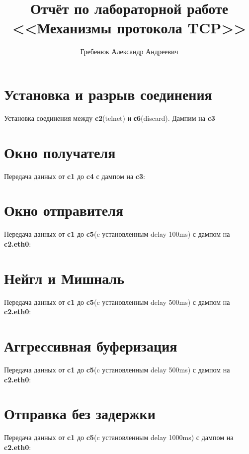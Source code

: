 \documentclass[a4paper,12pt]{article}
\title{Отчёт по лабораторной работе \\ <<Механизмы протокола TCP>>}
\author{Гребенюк Александр Андреевич}
\begin{document}
\maketitle

\tableofcontents


\clearpage
\section{Установка и разрыв соединения}
Установка соединения между \textbf{c2}(telnet) и \textbf{с6}(discard). Дампим на \textbf{c3}

\clearpage
\section{Окно получателя}
Передача данных от \textbf{c1} до \textbf{c4} с дампом на \textbf{c3}:

\clearpage
\section{Окно отправителя}
Передача данных от \textbf{c1} до \textbf{c5}(c установленным delay 100ms) с дампом на \textbf{c2.eth0}:

\clearpage
\section{Нейгл и Мишналь}
Передача данных от \textbf{c1} до \textbf{c5}(c установленным delay 500ms) с дампом на \textbf{c2.eth0}:

\clearpage
\section{Аггрессивная буферизация}
Передача данных от \textbf{c1} до \textbf{c5}(c установленным delay 500ms) с дампом на \textbf{c2.eth0}:

\clearpage
\section{Отправка без задержки}
Передача данных от \textbf{c1} до \textbf{c5}(c установленным delay 1000ms) с дампом на \textbf{c2.eth0}:
\end{document}
